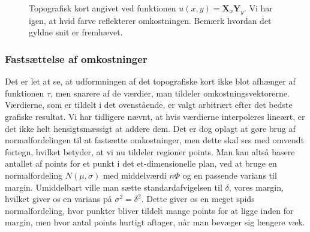 {\begin{figure}[h]
    \setlength\fboxsep{0pt}
    \setlength\fboxrule{0.5pt}
    \begin{center}
    \end{center}
    \caption[]{Topografisk kort angivet ved funktionen $u(x, y) =
    \mathbf{X}_x\mathbf{Y}_y$. Vi har igen, at hvid farve reflekterer
    omkostningen. Bemærk hvordan det gyldne snit er fremhævet.}
    \label{topography_times}
\end{figure}

\subsubsection{Fastsættelse af omkostninger}
Det er let at se, at udformningen af det topografiske kort ikke blot
afhænger af funktionen $\tau$, men snarere af de værdier, man tildeler
omkostningsvektorerne. Værdierne, som er tildelt i det ovenstående, er
valgt arbitrært efter det bedste grafiske resultat. Vi har tidligere
nævnt, at hvis værdierne interpoleres lineært, er det ikke helt
hensigtsmæssigt at addere dem. Det er dog oplagt at gøre brug af
normalfordelingen til at fastsætte omkostninger, men dette skal ses med
omvendt fortegn, hvilket betyder, at vi nu tildeler regioner points. Man
kan altså basere antallet af points for et punkt i det et-dimensionelle
plan, ved at bruge en normalfordeling $N(\mu, \sigma)$ med middelværdi
$n\varPhi$ og en passende varians til margin. Umiddelbart ville man
sætte standardafvigelsen til $\delta$, vores margin, hvilket giver os en
varians på $\sigma^{2} = \delta^{2}$. Dette giver os en meget spids
normalfordeling, hvor punkter bliver tildelt mange points for at ligge
inden for margin, men hvor antal points hurtigt aftager, når man bevæger
sig længere væk.


}

